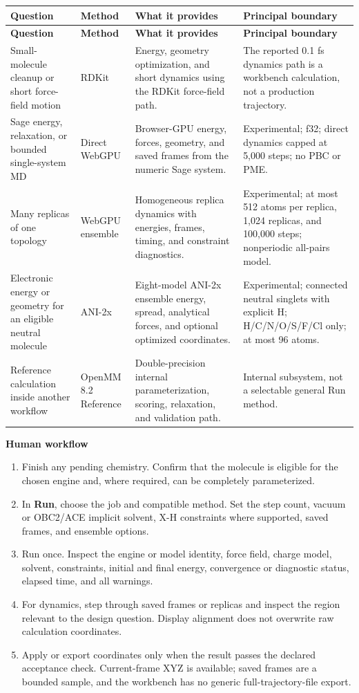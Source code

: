 \documentclass[10pt,letterpaper]{article}
\newcommand{\subhead}[1]{%
  \par\needspace{2\baselineskip}\vspace{2.5pt}%
  {\fontsize{10.91}{13.1}\selectfont\bfseries #1}\par\vspace{-1.5pt}}
\begin{document}
\begingroup
\fontsize{7.8}{9.2}\selectfont
\begin{longtable}{@{}p{1.31in}p{0.78in}p{1.77in}p{1.85in}@{}}
\toprule
\textbf{Question} & \textbf{Method} & \textbf{What it provides} & \textbf{Principal boundary}\\
\midrule
\endfirsthead
\toprule
\textbf{Question} & \textbf{Method} & \textbf{What it provides} & \textbf{Principal boundary}\\
\midrule
\endhead
Small-molecule cleanup or short force-field motion & RDKit & Energy, geometry optimization, and short dynamics using the RDKit force-field path. & The reported 0.1 fs dynamics path is a workbench calculation, not a production trajectory.\\
Sage energy, relaxation, or bounded single-system MD & Direct WebGPU & Browser-GPU energy, forces, geometry, and saved frames from the numeric Sage system. & Experimental; f32; direct dynamics capped at 5,000 steps; no PBC or PME.\\
Many replicas of one topology & WebGPU ensemble & Homogeneous replica dynamics with energies, frames, timing, and constraint diagnostics. & Experimental; at most 512 atoms per replica, 1,024 replicas, and 100,000 steps; nonperiodic all-pairs model.\\
Electronic energy or geometry for an eligible neutral molecule & ANI-2x & Eight-model ANI-2x ensemble energy, spread, analytical forces, and optional optimized coordinates. & Experimental; connected neutral singlets with explicit H; H/C/N/O/S/F/Cl only; at most 96 atoms.\\
Reference calculation inside another workflow & OpenMM 8.2 Reference & Double-precision internal parameterization, scoring, relaxation, and validation path. & Internal subsystem, not a selectable general Run method.\\
\bottomrule
\end{longtable}
\endgroup

\subhead{Human workflow}

\begin{enumerate}
\item Finish any pending chemistry. Confirm that the molecule is eligible for the chosen engine and, where required, can be completely parameterized.
\item In \textbf{Run}, choose the job and compatible method. Set the step count, vacuum or OBC2/ACE implicit solvent, X-H constraints where supported, saved frames, and ensemble options.
\item Run once. Inspect the engine or model identity, force field, charge model, solvent, constraints, initial and final energy, convergence or diagnostic status, elapsed time, and all warnings.
\item For dynamics, step through saved frames or replicas and inspect the region relevant to the design question. Display alignment does not overwrite raw calculation coordinates.
\item Apply or export coordinates only when the result passes the declared acceptance check. Current-frame XYZ is available; saved frames are a bounded sample, and the workbench has no generic full-trajectory-file export.
\end{enumerate}
\end{document}
